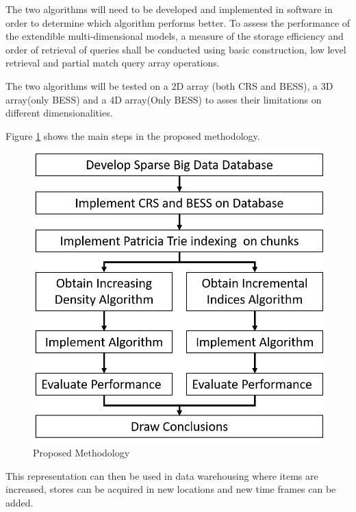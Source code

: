  The two algorithms will need to be developed and implemented in software in order to determine which algorithm performs better. To assess the performance of the extendible multi-dimensional models, a measure of the storage efficiency and order of retrieval of queries shall be conducted using basic construction, low level retrieval and partial match query array operations.
 
 The two algorithms will be tested on a 2D array (both CRS and BESS), a 3D array(only BESS) and a 4D array(Only BESS) to asses their limitations on different dimensionalities.
 
 Figure \ref{fig:proposedmethod} shows the main steps in the proposed methodology.

 
 \begin{figure}[H]
 	\centering
 	\includegraphics[width=0.7\linewidth]{proposedMethod2}
 	\caption{Proposed Methodology}
 	\label{fig:proposedmethod}
 \end{figure}
 
This representation can then be used in data warehousing where items are increased, stores can be acquired in new locations and new time frames can be added.
